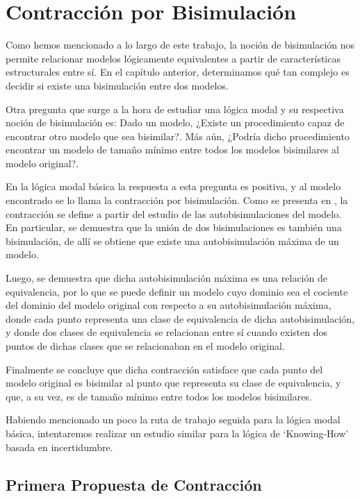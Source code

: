\chapter{Contracción por Bisimulación}

Como hemos mencionado a lo largo de este trabajo, la noción de bisimulación nos permite relacionar modelos lógicamente equivalentes a partir de 
características estructurales entre sí. En el capítulo anterior, determinamos qué tan complejo es decidir si existe una bisimulación entre dos 
modelos.

Otra pregunta que surge a la hora de estudiar una lógica modal y su respectiva noción de bisimulación es:
Dado un modelo, ¿Existe un procedimiento capaz de encontrar otro modelo que sea bisimilar?. Más aún, ¿Podría dicho procedimiento encontrar 
un modelo de tamaño mínimo entre todos los modelos bisimilares al modelo original?.

En la lógica modal básica la respuesta a esta pregunta es positiva, y al modelo encontrado se lo llama la contracción por bisimulación.
Como se presenta en \cite[Capítulo 3]{HandbookModalLogic}, la contracción se define a partir del estudio de las autobisimulaciones del modelo. En particular,
se demuestra que la unión de dos bisimulaciones es también una bisimulación, de allí se obtiene que existe una autobisimulación máxima de un modelo.

Luego, se demuestra que dicha autobisimulación máxima es una relación de equivalencia, por lo que se puede definir un modelo cuyo dominio sea el cociente
del dominio del modelo original con respecto a su autobisimulación máxima, donde cada punto representa una clase de equivalencia de dicha autobisimulación, y donde 
dos clases de equivalencia se relacionan entre sí cuando existen dos puntos de dichas clases que se relacionaban en el modelo original.

Finalmente se concluye que dicha contracción satisface que cada punto del modelo original es bisimilar al punto que representa su clase de equivalencia, y 
que, a su vez, es de tamaño mínimo entre todos los modelos bisimilares.

Habiendo mencionado un poco la ruta de trabajo seguida para la lógica modal básica, intentaremos realizar un estudio similar para la lógica de `Knowing-How' basada en 
incertidumbre.

\section{Primera Propuesta de Contracción}

